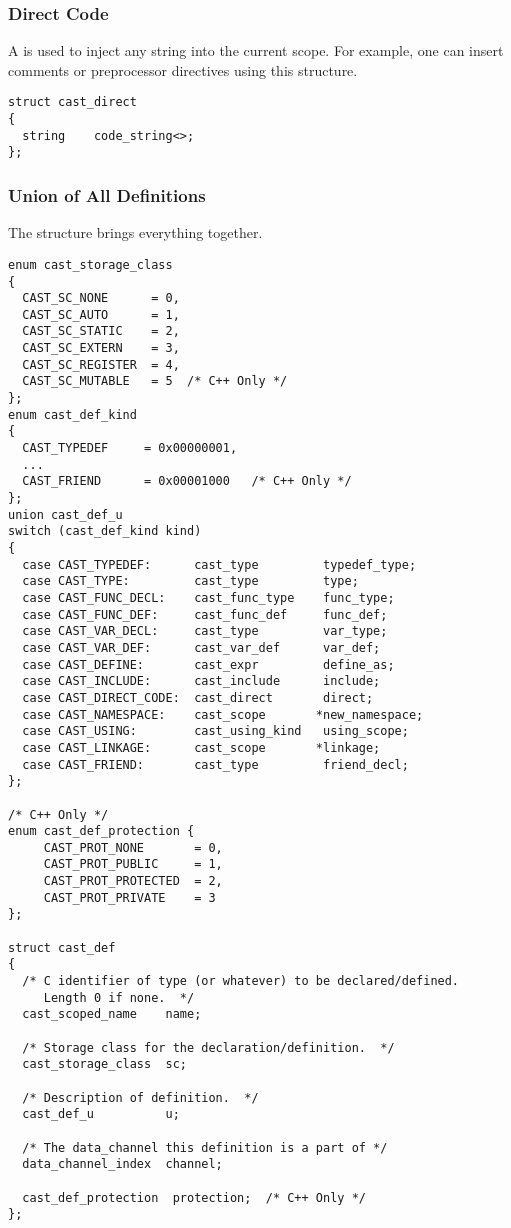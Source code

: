 \subsubsection{Direct Code}

A  is used to inject any string into the current scope.
For example, one can insert comments or preprocessor directives using this
structure.

\begin{verbatim}
struct cast_direct
{
  string    code_string<>;
};
\end{verbatim}

\subsubsection{Union of All Definitions}

The  structure brings everything together.

\begin{verbatim}
enum cast_storage_class
{
  CAST_SC_NONE      = 0,
  CAST_SC_AUTO      = 1,
  CAST_SC_STATIC    = 2,
  CAST_SC_EXTERN    = 3,
  CAST_SC_REGISTER  = 4,
  CAST_SC_MUTABLE   = 5  /* C++ Only */
};
enum cast_def_kind
{
  CAST_TYPEDEF     = 0x00000001,
  ...
  CAST_FRIEND      = 0x00001000   /* C++ Only */
};
union cast_def_u
switch (cast_def_kind kind)
{
  case CAST_TYPEDEF:      cast_type         typedef_type;
  case CAST_TYPE:         cast_type         type;
  case CAST_FUNC_DECL:    cast_func_type    func_type;
  case CAST_FUNC_DEF:     cast_func_def     func_def;
  case CAST_VAR_DECL:     cast_type         var_type;
  case CAST_VAR_DEF:      cast_var_def      var_def;
  case CAST_DEFINE:       cast_expr         define_as;
  case CAST_INCLUDE:      cast_include      include;
  case CAST_DIRECT_CODE:  cast_direct       direct;
  case CAST_NAMESPACE:    cast_scope       *new_namespace;
  case CAST_USING:        cast_using_kind   using_scope;
  case CAST_LINKAGE:      cast_scope       *linkage;
  case CAST_FRIEND:       cast_type         friend_decl;
};

/* C++ Only */
enum cast_def_protection {
     CAST_PROT_NONE       = 0,
     CAST_PROT_PUBLIC     = 1,
     CAST_PROT_PROTECTED  = 2,
     CAST_PROT_PRIVATE    = 3
};

struct cast_def
{
  /* C identifier of type (or whatever) to be declared/defined.
     Length 0 if none.  */
  cast_scoped_name    name;

  /* Storage class for the declaration/definition.  */
  cast_storage_class  sc;

  /* Description of definition.  */
  cast_def_u          u;

  /* The data_channel this definition is a part of */
  data_channel_index  channel;

  cast_def_protection  protection;  /* C++ Only */
};
\end{verbatim}

